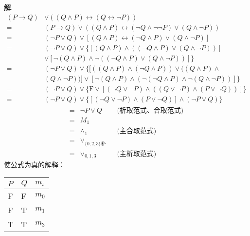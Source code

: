 \documentclass[12pt]{article}
\newenvironment{firstlayer}%
{\begin{list}{}{\renewcommand{\makelabel}[1]{\textbf{##1}.\hfil}
}}
{\end{list}}
\newenvironment{secondlayer}%
{\begin{list}{}{\renewcommand{\makelabel}[1]{(##1)\hfil}
}}
{\end{list}}
\begin{document}
\begin{CJK}{UTF8}{gbsn}
\begin{firstlayer}
\begin{secondlayer}
  \textbf{解}.
  \begin{align}
    (P\rightarrow Q)&\vee ((Q\wedge P)\leftrightarrow (Q\leftrightarrow \neg P)) \nonumber \\
    =&(P\rightarrow Q)\vee ((Q\wedge P)\leftrightarrow (\neg Q \wedge \neg \neg P)\vee (Q \wedge \neg P))\nonumber \\
    =&(\neg P \vee Q)\vee [(Q\wedge P)\leftrightarrow (\neg Q \wedge P)\vee (Q \wedge \neg P)]\nonumber \\
    =&(\neg P \vee Q)\vee\{[(Q\wedge P)\wedge ((\neg Q \wedge P)\vee (Q \wedge \neg P))] \nonumber \\ 
    &\vee [\neg (Q\wedge P)\wedge \neg ((\neg Q \wedge P)\vee (Q \wedge \neg P))] \}\nonumber \\
    =&(\neg P \vee Q)\vee\{[((Q\wedge P)\wedge (\neg Q \wedge P))\vee ((Q\wedge P)\wedge\nonumber \\
    &(Q \wedge \neg P))]\vee [\neg (Q\wedge P)\wedge (\neg(\neg Q \wedge P)\wedge \neg(Q \wedge \neg P))] \}\nonumber \\
    =&(\neg P \vee Q)\vee\{\text{F}\vee[(\neg Q\vee \neg P)\wedge (( Q \vee \neg P)\wedge ( P\vee \neg Q))] \}\nonumber \\
    =&(\neg P \vee Q)\vee\{[(\neg Q\vee \neg P)\wedge ( P\vee \neg Q)]\wedge ( \neg P \vee Q) \}\nonumber 
  \end{align}
  \begin{align}
    =&\neg P \vee Q&&\text{(析取范式、合取范式)}\\
    =&M_1\nonumber \\
    =&\wedge_1&& \text{(主合取范式)}\\
    =&\vee_{\{0,2,3\}\text{补}}\nonumber \\
    =&\vee_{0,1,3}&& \text{(主析取范式)}
  \end{align}
使公式为真的解释：

\begin{longtable}[]{@{}lll@{}}
\toprule
\(P\) & \(Q\) & \(m_i\)\tabularnewline
\midrule
\endhead
F & F & \(m_0\)\tabularnewline
F & T & \(m_1\)\tabularnewline
T & T & \(m_3\)\tabularnewline
\bottomrule
\end{longtable}
\end{secondlayer}

\end{firstlayer}

\end{CJK}
\end{document}
